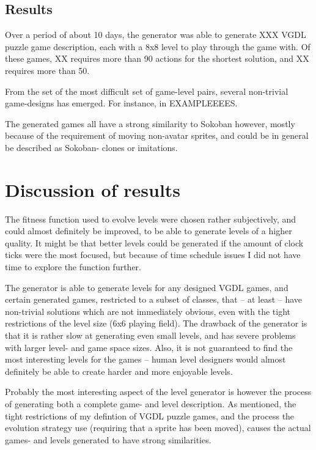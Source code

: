 \documentclass[a4paper,titlepage,final]{report}
\begin{document}


\subsection{Results} 
Over a period of about 10 days, the generator was able to generate XXX VGDL puzzle game description, each with a 8x8 level to play through the game with.
Of these games, XX requires more than 90 actions for the shortest solution, and XX requires more than 50.

From the set of the most difficult set of game-level pairs, several non-trivial game-designs has emerged.
For instance, in 
EXAMPLEEEES.  

The generated games all have a strong similarity to Sokoban however, mostly because of the requirement of moving non-avatar sprites, and could be in general be described as Sokoban- clones or imitations.

\section{Discussion of results} 
\label{sec_task3discussion}
The fitness function used to evolve levels were chosen rather subjectively, and could almost definitely be improved, to be able to generate levels of a higher quality.
It might be that better levels could be generated if the amount of clock ticks were the most focused, but because of time schedule issues I did not have time to explore the function further.

The generator is able to generate levels for any designed VGDL games, and certain generated games, restricted to a subset of classes, that -- at least -- have non-trivial solutions which are not immediately obvious, even with the tight restrictions of the level size (6x6 playing field).
The drawback of the generator is that it is rather slow at generating even small levels, and has severe problems with larger level- and game space sizes.
Also, it is not guaranteed to find the most interesting levels for the games -- human level designers would almost definitely be able to create harder and more enjoyable levels.

Probably the most interesting aspect of the level generator is however the process of generating both a complete game- and level description.
As mentioned, the tight restrictions of my defintion of VGDL puzzle games, and the process the evolution strategy use (requiring that a sprite has been moved), causes the actual games- and levels generated to have strong similarities.
\end{document}
